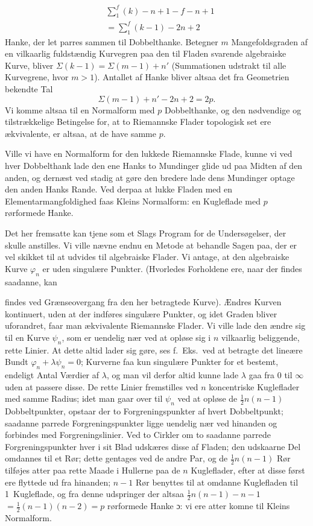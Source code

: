 \documentclass{article}
\begin{document}
\[
\begin{aligned}
&\sum_1^f (k) - n + 1 - f - n + 1 \\
&= \sum_1^f (k - 1) - 2n + 2
\end{aligned}
\]
Hanke, der let parres sammen til Dobbelthanke. Betegner $m$ Mangefoldsgraden af en vilkaarlig fuldstændig Kurvegren paa den til Fladen svarende algebraiske Kurve, bliver $\Sigma(k - 1) = \Sigma(m - 1) + n'$ (Summationen udstrakt til alle Kurvegrene, hvor $m > 1$). Antallet af Hanke bliver altsaa det fra Geometrien bekendte Tal
\[
\Sigma(m - 1) + n' - 2n + 2 = 2p.
\]
Vi komme altsaa til en Normalform med $p$ Dobbelthanke, og den nødvendige og tilstrækkelige Betingelse for, at to Riemannske Flader topologisk set ere ækvivalente, er altsaa, at de have samme $p$.

Ville vi have en Normalform for den lukkede Riemannske Flade, kunne vi ved hver Dobbelthank lade den ene Hanks to Mundinger glide ud paa Midten af den anden, og dernæst ved stadig at gøre den bredere lade dens Mundinger optage den anden Hanks Rande. Ved derpaa at lukke Fladen med en Elementarmangfoldighed faas Kleins Normalform: en Kugleflade med $p$ rørformede Hanke.

Det her fremsatte kan tjene som et Slags Program for de Undersøgelser, der skulle anstilles. Vi ville nævne endnu en Metode at behandle Sagen paa, der er vel skikket til at udvides til algebraiske Flader. Vi antage, at den algebraiske Kurve $\varphi_n$ er uden singulære Punkter. (Hvorledes Forholdene ere, naar der findes saadanne, kan

findes ved Grænseovergang fra den her betragtede Kurve). Ændres Kurven kontinuert, uden at der indføres singulære Punkter, og idet Graden bliver uforandret, faar man ækvivalente Riemannske Flader. Vi ville lade den ændre sig til en Kurve $\psi_n$, som er uendelig nær ved at opløse sig i $n$ vilkaarlig beliggende, rette Linier. At dette altid lader sig gøre, ses f.~Eks.\ ved at betragte det lineære Bundt $\varphi_n + \lambda \psi_n = 0$; Kurverne faa kun singulære Punkter for et bestemt, endeligt Antal Værdier af $\lambda$, og man vil derfor altid kunne lade $\lambda$ gaa fra $0$ til $\infty$ uden at passere disse. De rette Linier fremstilles ved $n$ koncentriske Kugleflader med samme Radius; idet man gaar over til $\psi_n$ ved at opløse de $\frac{1}{2} n(n - 1)$ Dobbeltpunkter, opstaar der to Forgreningspunkter af hvert Dobbeltpunkt; saadanne parrede Forgreningspunkter ligge uendelig nær ved hinanden og forbindes med Forgreningslinier. Ved to Cirkler om to saadanne parrede Forgreningspunkter hver i sit Blad udskæres disse af Fladen; den udskaarne Del omdannes til et Rør; dette gentages ved de andre Par, og de $\frac{1}{2} n(n - 1)$ Rør tilføjes atter paa rette Maade i Hullerne paa de $n$ Kugleflader, efter at disse først ere flyttede ud fra hinanden; $n - 1$ Rør benyttes til at omdanne Kuglefladen til 1~Kugleflade, og fra denne udspringer der altsaa $\frac{1}{2} n(n - 1) - n - 1$ $= \frac{1}{2}(n - 1)(n - 2) = p$ rørformede Hanke ɔ: vi ere atter komne til Kleins Normalform.
\end{document}
